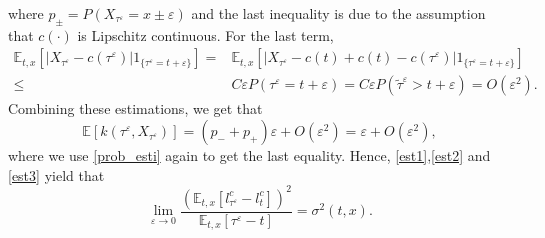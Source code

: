 \documentclass[11pt]{article}
\begin{document}
where $p_{\pm}=P(X_{\tau^{\varepsilon}}=x\pm \varepsilon)$ and the last inequality is due to the assumption that $c(\cdot)$ is Lipschitz continuous. For the last term, 
\begin{equation*}
   \begin{split}
\mathbb E_{t,x}[|X_{\tau^{\varepsilon}}-c(\tau^{\varepsilon})|1_{\{\tau^{\varepsilon}=t+\varepsilon\}}]=&\mathbb E_{t,x}[|X_{\tau^{\varepsilon}}-c(t)+c(t)-c(\tau^{\varepsilon})|1_{\{\tau^{\varepsilon}=t+\varepsilon\}}]\\
\le&C\varepsilon P(\tau^{\varepsilon}=t+\varepsilon)=C\varepsilon P(\tilde \tau^{\varepsilon}>t+\varepsilon)=O(\varepsilon^2).
   \end{split} 
\end{equation*}
Combining these estimations, we get that 
\begin{equation}\label{est3}
\mathbb E[k(\tau^{\varepsilon},X_{\tau^{\varepsilon}})]=(p_{-}+p_{+})\varepsilon+O(\varepsilon^2)=\varepsilon+O(\varepsilon^2),
\end{equation}
where we use \eqref{prob_esti} again to get the last equality.
Hence, \eqref{est1},\eqref{est2} and \eqref{est3} yield that 
\begin{equation*}
\lim_{\varepsilon\rightarrow 0}\frac{(\mathbb E_{t,x}[l^c_{\tau^{\varepsilon}}-l^c_t])^2}{\mathbb E_{t,x}[\tau^{\varepsilon}-t]}=\sigma^2(t,x).
\end{equation*}
\end{document}
